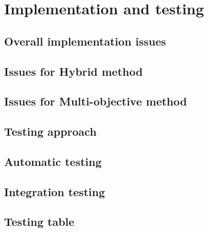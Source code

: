 \documentclass[a4paper,11pt]{article}
\begin{document}
\section{Implementation and testing}

\subsection{Overall implementation issues}



\subsection{Issues for Hybrid method}

\subsection{Issues for Multi-objective method}

\subsection{Testing approach}

\subsection{Automatic testing}

\subsection{Integration testing}


\subsection{Testing table}
\end{document}
